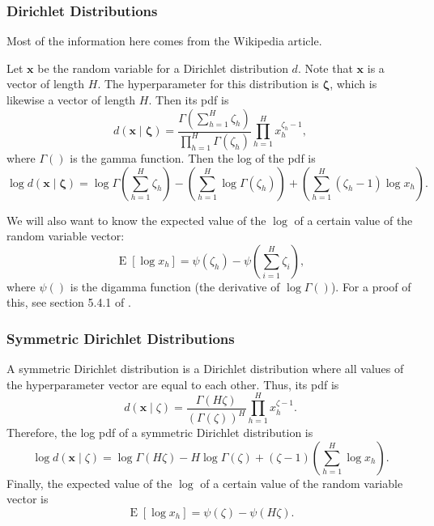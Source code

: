 \documentclass[12pt]{article}
\newcommand{\E}{\operatorname{E}}
\begin{document}
\subsubsection{Dirichlet Distributions}

Most of the information here comes from the Wikipedia article.

Let $\bm{x}$ be the random variable for a Dirichlet distribution $d$.  Note that
$\bm{x}$ is a vector of length $H$.  The hyperparameter for this distribution is
$\bm{\zeta}$, which is likewise a vector of length $H$.  Then its pdf is
\begin{equation}\label{eq:dirpdf}
    d(\bm{x} \mid \bm{\zeta}) =
    \frac{\Gamma (\sum_{h=1}^{H} \zeta_{h})}{\prod_{h=1}^{H} \Gamma (\zeta_{h})}
    \prod_{h=1}^{H}x_{h}^{\zeta_{h} - 1},
\end{equation}
where $\Gamma()$ is the gamma function.  Then the log of the pdf is
\begin{equation}\label{eq:logdirpdf}
    \log d(\bm{x} \mid \bm{\zeta}) =
    \log \Gamma(\sum_{h=1}^{H} \zeta_{h}) - \left(\sum_{h=1}^{H}
    \log \Gamma(\zeta_{h})\right) + \left(\sum_{h=1}^{H} (\zeta_{h} - 1) \log x_{h}
    \right).
\end{equation}

We will also want to know the expected value of the $\log$ of a certain value of
the random variable vector:
\begin{equation}\label{eq:expectedlogdir}
    \E [\log x_{h}] = \psi(\zeta_{h}) - \psi(\sum_{i=1}^{H} \zeta_{i}),
\end{equation}
where $\psi()$ is the digamma function (the derivative of $\log \Gamma()$).  For
a proof of this, see section 5.4.1 of \autocite{kb}.

\subsubsection{Symmetric Dirichlet Distributions}

A symmetric Dirichlet distribution is a Dirichlet distribution where all values
of the hyperparameter vector are equal to each other.  Thus, its pdf is
\begin{equation}\label{eq:symdirpdf}
    d(\bm{x} \mid \zeta) =
    \frac{\Gamma(H\zeta)}{(\Gamma(\zeta))^{H}}\prod_{h=1}^{H}x_{h}^{\zeta-1}.
\end{equation}
Therefore, the log pdf of a symmetric Dirichlet distribution is
\begin{equation}\label{eq:logsymdirpdf}
    \log d(\bm{x} \mid \zeta) =
    \log \Gamma(H\zeta) - H \log \Gamma(\zeta) + (\zeta - 1)
    (\sum_{h=1}^{H} \log x_{h}).
\end{equation}
Finally, the expected value of the $\log$ of a certain value of the random
variable vector is
\begin{equation}\label{eq:expectedlogsymdir}
    \E [\log x_{h}] = \psi(\zeta) - \psi(H\zeta).
\end{equation}
\end{document}
